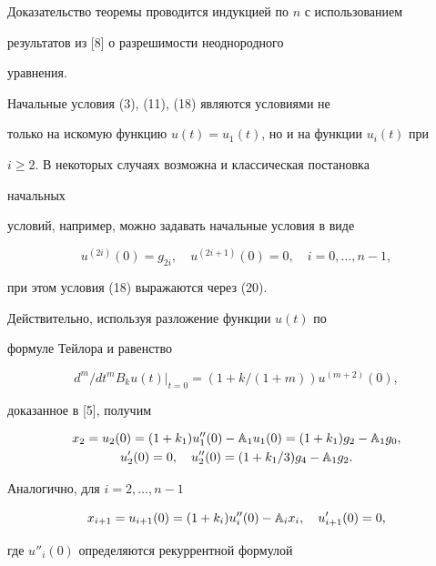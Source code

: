 


Доказательство теоремы проводится индукцией по $n$ с использованием 


результатов из [8] о разрешимости неоднородного 


уравнения. 


Начальные условия (3), (11), (18) являются условиями не 


только на искомую функцию $u(t)=u_1(t)$, но и на функции $u_i(t)$ при 


$i\ge 2$. В некоторых случаях возможна и классическая постановка 


начальных 


условий, например, можно задавать начальные условия в виде 


\begin{equation} 


u^{(2i)}(0)=g_{2i},\quad u^{(2i+1)}(0)=0,\quad 


i=0,\dotsc,n-1, 


\end{equation} 


при этом условия (18) выражаются через (20). 


 


Действительно, используя разложение функции $u(t)$ по  


формуле Тейлора и равенство 


$$ 


d^m/dt^m B_k u(t)|_{t=0}=(1+k/(1+m))u^{(m+2)}(0), 


$$ 


доказанное в [5], получим 


\begin{gather*} 


x_2=u_2(0)=(1+k_1)u''_1(0)-\Bbb A_1u_1(0)=(1+k_1)g_2-\Bbb A_1g_0,\\ 


% 


u'_2(0)=0,\quad u''_2(0)=(1+k_1/3)g_4-\Bbb A_1g_2. 


\end{gather*} 


Аналогично, для $i=2,\dotsc,n-1$ 


$$ 


x_{i+1}=u_{i+1}(0)=(1+k_i)u''_i(0)-\Bbb A_i x_i,\quad 


u'_{i+1}(0)=0, 


$$ 


где $u''_i(0)$ определяются рекуррентной формулой 


